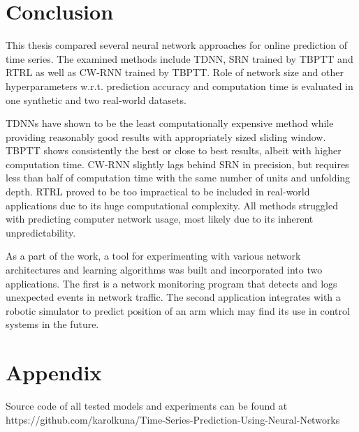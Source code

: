 \documentclass[12pt,oneside]{fithesis2}
\begin{document}
\chapter{Conclusion}
This thesis compared several neural network approaches for online prediction of time series. The examined methods include TDNN, SRN trained by TBPTT and RTRL as well as CW-RNN trained by TBPTT. Role of network size and other hyperparameters w.r.t. prediction accuracy and computation time is evaluated in one synthetic and two real-world datasets. \par
TDNNs have shown to be the least computationally expensive method while providing reasonably good results with appropriately sized sliding window. TBPTT shows consistently the best or close to best results, albeit with higher computation time. CW-RNN slightly lags behind SRN in precision, but requires less than half of computation time with the same number of units and unfolding depth. RTRL proved to be too impractical to be included in real-world applications due to its huge computational complexity. All methods struggled with predicting computer network usage, most likely due to its inherent unpredictability.\par
As a part of the work, a tool for experimenting with various network architectures and learning algorithms was built and incorporated into two applications. The first is a network monitoring program that detects and logs unexpected events in network traffic. The second application integrates with a robotic simulator to predict position of an arm which may find its use in control systems in the future.


    \appendix
    \chapter{Appendix}
    Source code of all tested models and experiments can be found at https://github.com/karolkuna/Time-Series-Prediction-Using-Neural-Networks
    
	
	
    
\end{document}
